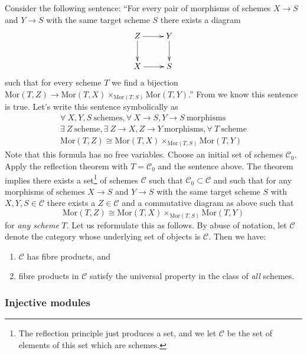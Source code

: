 \noindent
Consider the following sentence: ``For every pair of morphisms of
schemes $X \to S$ and $Y\to S$ with the same target scheme $S$
there exists a diagram
$$
\xymatrix{
Z \ar[r] \ar[d] & Y \ar[d] \cr
X \ar[r] & S \cr
}
$$
such that for every scheme $T$ we 
find a bijection $\text{Mor}(T, Z) \to \text{Mor}(T,X)
\times_{\text{Mor}(T,S)} \text{Mor}(T, Y)$.''
From \cite{H} we know this sentence is true.
Let's write this sentence symbolically as
\begin{eqnarray*}
\forall\ X,Y,S\ \text{schemes},
\forall\ X\to S, Y\to S\ \text{morphisms} \\
\exists\ Z\ \text{scheme},
\exists\ Z \to X, Z\to Y\ \text{morphisms},
\forall\ T\ \text{scheme} \\
\text{Mor}(T, Z) \cong \text{Mor}(T,X)
\times_{\text{Mor}(T,S)} \text{Mor}(T, Y)
\end{eqnarray*}
Note that this formula has no free variables.
Choose an initial set of schemes $\mathcal{C}_0$.
Apply the reflection theorem with $T=\mathcal{C}_0$
and the sentence above. The theorem implies
there exists a set\footnote{The
reflection principle just produces a set, and we
let $\mathcal{C}$ be the set of elements of this set which are schemes.}
of schemes
$\mathcal{C}$ such that
$\mathcal{C}_0 \subset \mathcal{C}$ and such that
for any morphisms of schemes $X \to S$ and $Y\to S$
with the same target scheme $S$ with $X,Y,S \in \mathcal{C}$
there exists a $Z \in \mathcal{C}$ and a commutative
diagram as above such that
$$
\text{Mor}(T, Z) \cong \text{Mor}(T,X)
\times_{\text{Mor}(T,S)} \text{Mor}(T, Y)
$$
for {\it any scheme} $T$. Let us reformulate this as follows.
By abuse of notation, let $\mathcal{C}$ denote the category
whose underlying set of objects is $\mathcal{C}$.
Then we have:
\begin{enumerate}
\item $\mathcal{C}$ has fibre products, and
\item fibre products in $\mathcal{C}$ satisfy
the universal property in the class of {\it all} schemes.
\end{enumerate}

\subsubsection{Injective modules}

